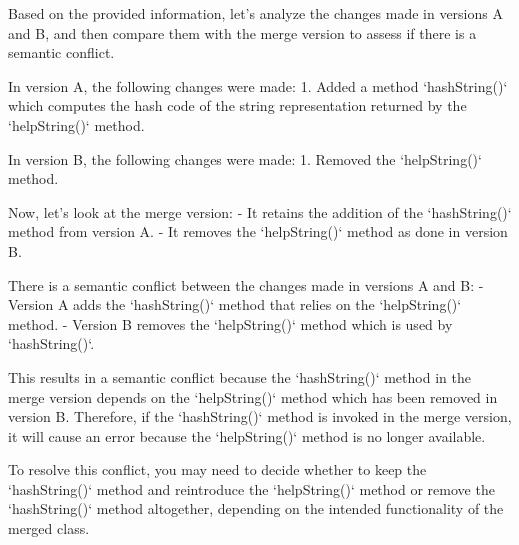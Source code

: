 \begin{response}
  Based on the provided information, let's analyze the changes made in versions A and B, and then compare them with the merge version to assess if there is a semantic conflict.

  In version A, the following changes were made:
  1. Added a method `hashString()` which computes the hash code of the string representation returned by the `helpString()` method.
  
  In version B, the following changes were made:
  1. Removed the `helpString()` method.
  
  Now, let's look at the merge version:
  - It retains the addition of the `hashString()` method from version A.
  - It removes the `helpString()` method as done in version B.
  
  There is a semantic conflict between the changes made in versions A and B:
  - Version A adds the `hashString()` method that relies on the `helpString()` method.
  - Version B removes the `helpString()` method which is used by `hashString()`.
  
  This results in a semantic conflict because the `hashString()` method in the merge version depends on the `helpString()` method which has been removed in version B. Therefore, if the `hashString()` method is invoked in the merge version, it will cause an error because the `helpString()` method is no longer available.
  
  To resolve this conflict, you may need to decide whether to keep the `hashString()` method and reintroduce the `helpString()` method or remove the `hashString()` method altogether, depending on the intended functionality of the merged class.
\end{response}